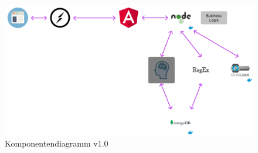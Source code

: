 \begin{figure}[!hbt]
\centering
\includegraphics[width=1.0\textwidth]{bilder/technologien/Komponenten-Diagram-v1.png}
\caption{Komponentendiagramm v1.0}
\label{fig:Komponentendiagramm_v1.0}
\end{figure}
\FloatBarrier %